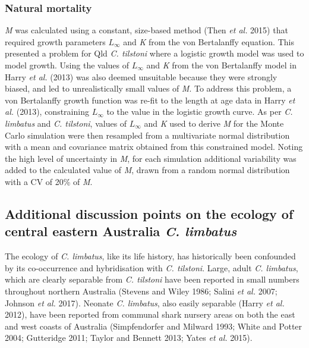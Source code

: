 \documentclass[]{article}
\begin{document}
\subsubsection{Natural mortality}\label{natural-mortality}

\emph{M} was calculated using a constant, size-based method (Then
\emph{et al.} 2015) that required growth parameters \(L_\infty\) and
\emph{K} from the von Bertalanffy equation. This presented a problem for
Qld \emph{C. tilstoni} where a logistic growth model was used to model
growth. Using the values of \(L_\infty\) and \emph{K} from the von
Bertalanffy model in Harry \emph{et al.} (2013) was also deemed
unsuitable because they were strongly biased, and led to unrealistically
small values of \emph{M}. To address this problem, a von Bertalanffy
growth function was re-fit to the length at age data in Harry \emph{et
al.} (2013), constraining \(L_\infty\) to the value in the logistic
growth curve. As per \emph{C. limbatus} and \emph{C. tilstoni}, values
of \(L_\infty\) and \emph{K} used to derive \emph{M} for the Monte Carlo
simulation were then resampled from a multivariate normal distribution
with a mean and covariance matrix obtained from this constrained model.
Noting the high level of uncertainty in \emph{M}, for each simulation
additional variability was added to the calculated value of \emph{M},
drawn from a random normal distribution with a CV of 20\% of \emph{M}.

\newpage

\subsection{\texorpdfstring{Additional discussion points on the ecology
of central eastern Australia \emph{C.
limbatus}}{Additional discussion points on the ecology of central eastern Australia C. limbatus}}\label{additional-discussion-points-on-the-ecology-of-central-eastern-australia-c.-limbatus}

The ecology of \emph{C. limbatus}, like its life history, has
historically been confounded by its co-occurrence and hybridisation with
\emph{C. tilstoni}. Large, adult \emph{C. limbatus}, which are clearly
separable from \emph{C. tilstoni} have been reported in small numbers
throughout northern Australia (Stevens and Wiley 1986; Salini \emph{et
al.} 2007; Johnson \emph{et al.} 2017). Neonate \emph{C. limbatus}, also
easily separable (Harry \emph{et al.} 2012), have been reported from
communal shark nursery areas on both the east and west coasts of
Australia (Simpfendorfer and Milward 1993; White and Potter 2004;
Gutteridge 2011; Taylor and Bennett 2013; Yates \emph{et al.} 2015).
\end{document}
